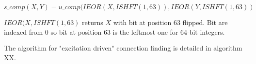 \documentclass[./thesis.tex]{subfiles}
\begin{document}
\begin{equation}
s\_comp(X,Y) = u\_comp(IEOR(X,ISHFT(1,63)), IEOR(Y,ISHFT(1,63))
\end{equation}


$IEOR(X,ISHFT(1,63)$ returns $X$ with bit at position 63 flipped. Bit are indexed from 0 so bit at position 63 is the leftmost one for 64-bit integers.

The algorithm for "excitation driven" connection finding is detailed in algorithm XX.

\end{document}
